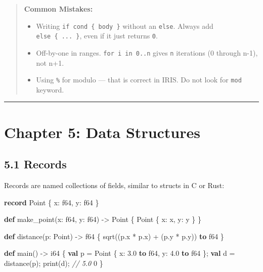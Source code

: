 \documentclass[
  english,
]{book}
\newenvironment{Shaded}{\begin{snugshade}}{\end{snugshade}}
\newcommand{\CommentTok}[1]{\textcolor[rgb]{0.42,0.60,0.33}{\textit{#1}}}
\newcommand{\DataTypeTok}[1]{\textcolor[rgb]{0.31,0.79,0.69}{#1}}
\newcommand{\DecValTok}[1]{\textcolor[rgb]{0.71,0.81,0.66}{#1}}
\newcommand{\FloatTok}[1]{\textcolor[rgb]{0.71,0.81,0.66}{#1}}
\newcommand{\FunctionTok}[1]{\textcolor[rgb]{0.86,0.86,0.67}{#1}}
\newcommand{\KeywordTok}[1]{\textcolor[rgb]{0.34,0.61,0.84}{\textbf{#1}}}
\newcommand{\NormalTok}[1]{\textcolor[rgb]{0.83,0.83,0.83}{#1}}
\newcommand{\OperatorTok}[1]{\textcolor[rgb]{0.83,0.83,0.83}{#1}}
\providecommand{\tightlist}{%
  \setlength{\itemsep}{0pt}\setlength{\parskip}{0pt}}
\begin{document}
\begin{quote}
\textbf{Common Mistakes:}

\begin{itemize}
\tightlist
\item
  Writing \texttt{if\ cond\ \{\ body\ \}} without an \texttt{else}.
  Always add \texttt{else\ \{\ ...\ \}}, even if it just returns
  \texttt{0}.
\item
  Off-by-one in ranges. \texttt{for\ i\ in\ 0..n} gives \texttt{n}
  iterations (0 through n-1), not n+1.
\item
  Using \texttt{\%} for modulo --- that is correct in IRIS. Do not look
  for \texttt{mod} keyword.
\end{itemize}
\end{quote}

\begin{center}\rule{0.5\linewidth}{0.5pt}\end{center}

\section{Chapter 5: Data Structures}\label{chapter-5-data-structures}

\subsection{5.1 Records}\label{records}

Records are named collections of fields, similar to structs in C or
Rust:

\begin{Shaded}
\begin{Highlighting}[]
\KeywordTok{record}\NormalTok{ Point \{}
\NormalTok{    x: }\DataTypeTok{f64}\NormalTok{,}
\NormalTok{    y: }\DataTypeTok{f64}
\NormalTok{\}}

\KeywordTok{def}\NormalTok{ make\_point(x: }\DataTypeTok{f64}\NormalTok{, y: }\DataTypeTok{f64}\NormalTok{) }\OperatorTok{{-}\textgreater{}}\NormalTok{ Point \{}
\NormalTok{    Point \{ x: x, y: y \}}
\NormalTok{\}}

\KeywordTok{def}\NormalTok{ distance(p: Point) }\OperatorTok{{-}\textgreater{}} \DataTypeTok{f64}\NormalTok{ \{}
    \FunctionTok{sqrt}\NormalTok{((p}\OperatorTok{.}\NormalTok{x }\OperatorTok{*}\NormalTok{ p}\OperatorTok{.}\NormalTok{x) }\OperatorTok{+}\NormalTok{ (p}\OperatorTok{.}\NormalTok{y }\OperatorTok{*}\NormalTok{ p}\OperatorTok{.}\NormalTok{y)) }\KeywordTok{to} \DataTypeTok{f64}
\NormalTok{\}}

\KeywordTok{def}\NormalTok{ main() }\OperatorTok{{-}\textgreater{}} \DataTypeTok{i64}\NormalTok{ \{}
    \KeywordTok{val}\NormalTok{ p }\OperatorTok{=}\NormalTok{ Point \{ x: }\FloatTok{3.0} \KeywordTok{to} \DataTypeTok{f64}\NormalTok{, y: }\FloatTok{4.0} \KeywordTok{to} \DataTypeTok{f64}\NormalTok{ \};}
    \KeywordTok{val}\NormalTok{ d }\OperatorTok{=}\NormalTok{ distance(p);}
    \FunctionTok{print}\NormalTok{(d);   }\CommentTok{// 5.0}
    \DecValTok{0}
\NormalTok{\}}
\end{Highlighting}
\end{Shaded}
\end{document}
